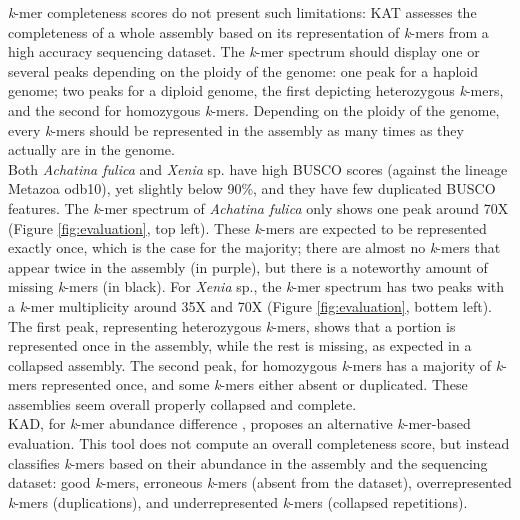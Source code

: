 \textit{k}-mer completeness scores do not present such limitations: KAT assesses the completeness of a whole assembly based on its representation of \textit{k}-mers from a high accuracy sequencing dataset. The \textit{k}-mer spectrum should display one or several peaks depending on the ploidy of the genome: one peak for a haploid genome; two peaks for a diploid genome, the first depicting heterozygous \textit{k}-mers, and the second for homozygous \textit{k}-mers. Depending on the ploidy of the genome, every \textit{k}-mers should be represented in the assembly as many times as they actually are in the genome. \\

Both \textit{Achatina fulica} and \textit{Xenia} sp. have high BUSCO scores (against the lineage Metazoa odb10), yet slightly below 90\%, and they have few duplicated BUSCO features. The \textit{k}-mer spectrum of \textit{Achatina fulica} only shows one peak around 70X (Figure \ref{fig:evaluation}, top left). These \textit{k}-mers are expected to be represented exactly once, which is the case for the majority; there are almost no \textit{k}-mers that appear twice in the assembly (in purple), but there is a noteworthy amount of missing \textit{k}-mers (in black). For \textit{Xenia} sp., the \textit{k}-mer spectrum has two peaks with a \textit{k}-mer multiplicity around 35X and 70X (Figure \ref{fig:evaluation}, bottem left). The first peak, representing heterozygous \textit{k}-mers, shows that a portion is represented once in the assembly, while the rest is missing, as expected in a collapsed assembly. The second peak, for homozygous \textit{k}-mers has a majority of \textit{k}-mers represented once, and some \textit{k}-mers either absent or duplicated. These assemblies seem overall properly collapsed and complete. \\

KAD, for \textit{k}-mer abundance difference \cite{kad}, proposes an alternative \textit{k}-mer-based evaluation. This tool does not compute an overall completeness score, but instead classifies \textit{k}-mers based on their abundance in the assembly and the sequencing dataset: good \textit{k}-mers, erroneous \textit{k}-mers (absent from the dataset), overrepresented \textit{k}-mers (duplications), and underrepresented \textit{k}-mers (collapsed repetitions). \\


